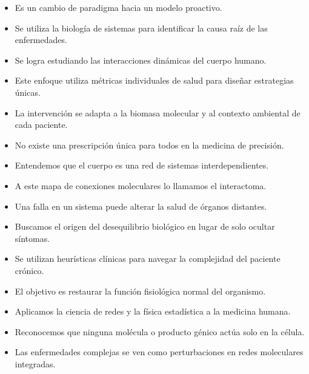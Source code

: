 

        \begin{itemize}
            \item Es un cambio de paradigma hacia un modelo proactivo.
            \item Se utiliza la biología de sistemas para identificar la causa raíz de las enfermedades.
            \item Se logra estudiando las interacciones dinámicas del cuerpo humano.
        \end{itemize}

        \begin{itemize}
            \item Este enfoque utiliza métricas individuales de salud para diseñar estrategias únicas.
            \item La intervención se adapta a la biomasa molecular y al contexto ambiental de cada paciente.
            \item No existe una prescripción única para todos en la medicina de precisión.
        \end{itemize}

        \begin{itemize}
            \item Entendemos que el cuerpo es una red de sistemas interdependientes.
            \item A este mapa de conexiones moleculares lo llamamos el interactoma.
            \item Una falla en un sistema puede alterar la salud de órganos distantes.
        \end{itemize}

        \begin{itemize}
            \item Buscamos el origen del desequilibrio biológico en lugar de solo ocultar síntomas.
            \item Se utilizan heurísticas clínicas para navegar la complejidad del paciente crónico.
            \item El objetivo es restaurar la función fisiológica normal del organismo.
        \end{itemize}

        \begin{itemize}
            \item Aplicamos la ciencia de redes y la física estadística a la medicina humana.
            \item Reconocemos que ninguna molécula o producto génico actúa solo en la célula.
            \item Las enfermedades complejas se ven como perturbaciones en redes moleculares integradas.
        \end{itemize}

